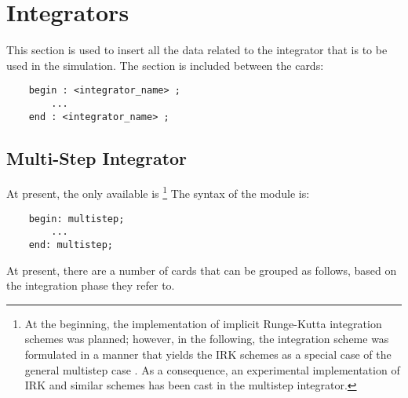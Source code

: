 %
%
%
%
%
% 
%
%

\chapter{Integrators}\label{sec:INTEGRATORS}
This section is used to insert all the data related to the integrator that
is to be used in the simulation. The section is included between the cards:
\begin{verbatim}
    begin : <integrator_name> ;
        ...
    end : <integrator_name> ;
\end{verbatim}





\section{Multi-Step Integrator}
At present, the only available 
is \footnote{
At the beginning, the implementation of implicit Runge-Kutta
integration schemes was planned; however, in the following,
the integration scheme was formulated in a manner that yields
the IRK schemes as a special case of the general multistep case
\cite{MASARATI-LANZ-MANTEGAZZA-2001}.
As a consequence, an experimental implementation of IRK 
and similar schemes has been cast in the multistep integrator.
}
The syntax of the module is:
\begin{verbatim}
    begin: multistep;
        ...
    end: multistep;
\end{verbatim}
At present, there are a number of cards that can be grouped as follows, 
based on the integration phase they refer to.

